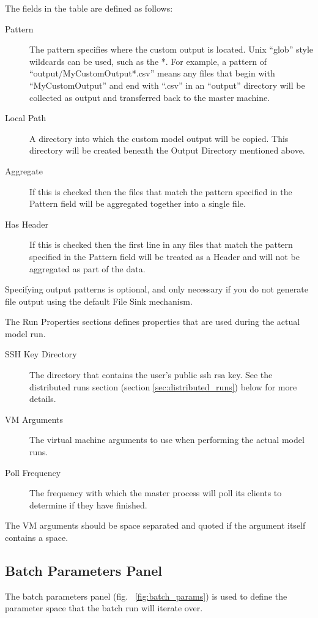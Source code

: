 \documentclass[11pt]{amsart}
\begin{document}
The fields in the table are defined as follows:

\begin{description}
\item[Pattern] The pattern specifies where the custom output is located. Unix ``glob'' style wildcards can be used, such as the *. For example, a pattern of ``output/MyCustomOutput*.csv'' means any files that begin with ``MyCustomOutput'' and end with ``.csv'' in an ``output'' directory will be collected as output and transferred back to the master machine.
\item[Local Path] A directory into which the custom model output will be copied. This directory will be created beneath the Output Directory mentioned above.
\item[Aggregate] If this is checked then the files that match the pattern specified in the Pattern field will be aggregated together into a single file.
\item[Has Header] If this is checked then the first line in any files that match the pattern specified in the Pattern field will be treated as a Header and will not be aggregated as part of the data.
\end{description}

Specifying output patterns is optional, and only necessary if you do not generate file output using the default File Sink mechanism.

The Run Properties sections defines properties that are used during the actual model run.
\label{sec:run_props}
\begin{description}
\item[SSH Key Directory] The directory that contains the user's public ssh rsa key. See the distributed runs section (section \ref{sec:distributed_runs}) below for more details.
\item[VM Arguments] The virtual machine arguments to use when performing the actual model runs.
\item[Poll Frequency] The frequency with which the master process will poll its clients to determine if they have finished.
\end{description}

The VM arguments should be space separated and quoted if the argument itself contains a space.

\subsection{Batch Parameters Panel}
The batch parameters panel (fig. ~\ref{fig:batch_params})  is used to define the parameter space that the batch run will iterate over.
\end{document}
